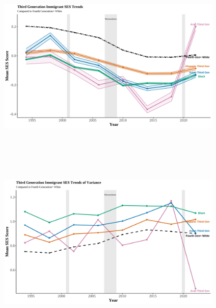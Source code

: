 \clearpage

\begin{center}
    \begin{figure}[H]
    \caption{}
    \includegraphics[width=\textwidth, height=9cm]{figure/06-SES-thirdgens.png} 
    \label{fig:diag}
    \caption*{\footnotesize{}}
    \end{figure}
    \hfill%
\end{center}


\clearpage

\begin{center}
    \begin{figure}[H]
    \caption{}
    \includegraphics[width=\textwidth, height=9cm]{figure/10-var-SES-thirdgens.png} 
    \label{fig:diag}
    \caption*{\footnotesize{}}
    \end{figure}
    \hfill%
\end{center}

